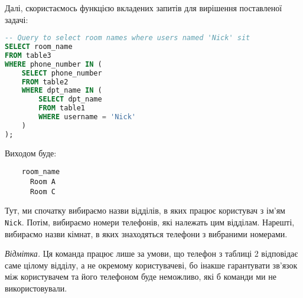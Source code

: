 \documentclass{hw_template}
\begin{document}
Далі, скористаємось функцією вкладених запитів для вирішення поставленої задачі:
\begin{lstlisting}[language=SQL]
-- Query to select room names where users named 'Nick' sit
SELECT room_name
FROM table3
WHERE phone_number IN (
    SELECT phone_number
    FROM table2
    WHERE dpt_name IN (
        SELECT dpt_name
        FROM table1
        WHERE username = 'Nick'
    )
);
\end{lstlisting}

Виходом буде:
\begin{lstlisting}
    room_name 
      Room A 
      Room C 
\end{lstlisting}

Тут, ми спочатку вибираємо назви відділів, в яких працює користувач з ім'ям
\texttt{Nick}. Потім, вибираємо номери телефонів, які належать цим відділам. Нарешті,
вибираємо назви кімнат, в яких знаходяться телефони з вибраними номерами.

\textit{Відмітка.} Ця команда працює лише за умови, що телефон з таблиці 2 
відповідає саме цілому відділу, а не окремому користувачеві, бо інакше 
гарантувати зв'язок між користувачем та його телефоном буде неможливо, які 
б команди ми не використовували.
\end{document}
